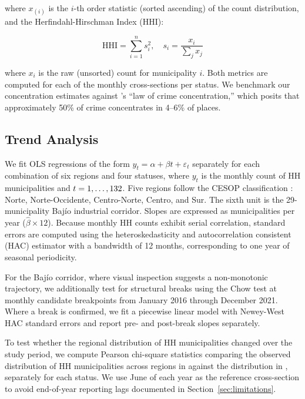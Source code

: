 \noindent where $x_{(i)}$ is the $i$-th order statistic (sorted ascending) of the count distribution, and the Herfindahl-Hirschman Index (HHI):

\begin{equation}
  \text{HHI} = \sum_{i=1}^{n} s_i^2, \quad s_i = \frac{x_i}{\sum_j x_j}
  \label{eq:hhi}
\end{equation}

\noindent where $x_i$ is the raw (unsorted) count for municipality $i$.
Both metrics are computed for each of the \nmonths{} monthly cross-sections per status.
We benchmark our concentration estimates against \citet{weisburd_2015}'s ``law of crime concentration,'' which posits that approximately 50\% of crime concentrates in 4--6\% of places.

\subsection{Trend Analysis}
\label{sec:trend}

We fit OLS regressions of the form $y_t = \alpha + \beta t + \varepsilon_t$ separately for each combination of six regions and four statuses, where $y_t$ is the monthly count of HH municipalities and $t = 1, \ldots, \text{132{}}$.
Five regions follow the CESOP classification \citep{mexicoencifras}: Norte, Norte-Occidente, Centro-Norte, Centro, and Sur.
The sixth unit is the 29-municipality Baj\'{i}o industrial corridor. Slopes are expressed as municipalities per year ($\hat\beta \times 12$).
Because monthly HH counts exhibit serial correlation, standard errors are computed using the \citet{newey_west_1987} heteroskedasticity and autocorrelation consistent (HAC) estimator with a bandwidth of 12 months, corresponding to one year of seasonal periodicity.

For the Baj\'{i}o corridor, where visual inspection suggests a non-monotonic trajectory, we additionally test for structural breaks using the Chow test at monthly candidate breakpoints from January 2016 through December 2021.
Where a break is confirmed, we fit a piecewise linear model with Newey-West HAC standard errors and report pre- and post-break slopes separately.

To test whether the regional distribution of HH municipalities changed over the study period, we compute Pearson chi-square statistics comparing the observed distribution of HH municipalities across regions in \bookendstart{} against the distribution in , separately for each status.
We use June of each year as the reference cross-section to avoid end-of-year reporting lags documented in Section~\ref{sec:limitations}.

